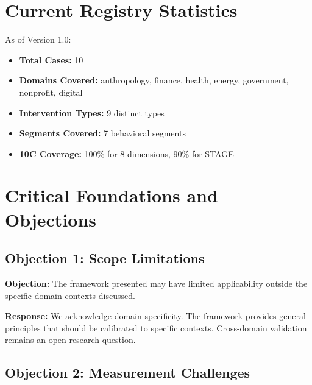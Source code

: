 \section{Current Registry Statistics}

As of Version 1.0:

\begin{itemize}
    \item \textbf{Total Cases:} 10
    \item \textbf{Domains Covered:} anthropology, finance, health, energy, government, nonprofit, digital
    \item \textbf{Intervention Types:} 9 distinct types
    \item \textbf{Segments Covered:} 7 behavioral segments
    \item \textbf{10C Coverage:} 100\% for 8 dimensions, 90\% for STAGE
\end{itemize}


\section{Critical Foundations and Objections}
\label{sec:cas-foundations}

\subsection{Objection 1: Scope Limitations}

\textbf{Objection:} The framework presented may have limited applicability
outside the specific domain contexts discussed.

\textbf{Response:} We acknowledge domain-specificity. The framework provides
general principles that should be calibrated to specific contexts. Cross-domain
validation remains an open research question.

\subsection{Objection 2: Measurement Challenges}

